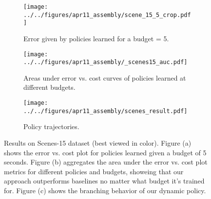 \begin{figure*}[ht]
\centering
    \centering
    \begin{subfigure}[b]{0.39\textwidth}
            \texttt{[image: ../../figures/apr11\_assembly/scene\_15\_5\_crop.pdf]}
            \caption{Error given by policies learned for a budget = 5.}
    \end{subfigure}%
    \begin{subfigure}[b]{0.36\textwidth}
            \texttt{[image: ../../figures/apr11\_assembly/\_scenes15\_auc.pdf]}
            \caption{Areas under error vs. cost curves of policies learned at different budgets.}
    \end{subfigure}%
    \begin{subfigure}[b]{0.25\textwidth}
            \texttt{[image: ../../figures/apr11\_assembly/scenes\_result.pdf]}
            \caption{Policy trajectories.}
    \end{subfigure}

    \caption{
Results on Scenes-15 dataset (best viewed in color).
Figure (a) shows the error vs. cost plot for policies learned given a budget of 5 seconds.
Figure (b) aggregates the area under the error vs. cost plot metrics for different policies and budgets, showeing that our approach outperforms baselines no matter what budget it's trained for.
Figure (c) shows the branching behavior of our dynamic policy.
}\label{fig:clf_scenes}
\end{figure*}
